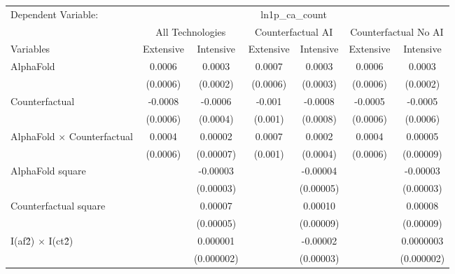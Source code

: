 \begingroup
\centering
\begin{tabular}{lcccccc}
   \tabularnewline \midrule \midrule
   Dependent Variable: & \multicolumn{6}{c}{ln1p\_ca\_count}\\
 & \multicolumn{2}{c}{All Technologies} & \multicolumn{2}{c}{Counterfactual AI} & \multicolumn{2}{c}{Counterfactual No AI} \\
\cmidrule(lr){1-1}\cmidrule(lr){2-3} \cmidrule(lr){4-5} \cmidrule(lr){6-7}
Variables & \multicolumn{1}{c}{Extensive} & \multicolumn{1}{c}{Intensive} & \multicolumn{1}{c}{Extensive} & \multicolumn{1}{c}{Intensive} & \multicolumn{1}{c}{Extensive} & \multicolumn{1}{c}{Intensive} \\
\cmidrule(lr){1-1}\cmidrule(lr){2-2} \cmidrule(lr){3-3} \cmidrule(lr){4-4} \cmidrule(lr){5-5} \cmidrule(lr){6-6} \cmidrule(lr){7-7}
   AlphaFold                          & 0.0006   & 0.0003     & 0.0007   & 0.0003    & 0.0006   & 0.0003\\   
                                      & (0.0006) & (0.0002)   & (0.0006) & (0.0003)  & (0.0006) & (0.0002)\\   
   Counterfactual                     & -0.0008  & -0.0006    & -0.001   & -0.0008   & -0.0005  & -0.0005\\   
                                      & (0.0006) & (0.0004)   & (0.001)  & (0.0008)  & (0.0006) & (0.0006)\\   
   AlphaFold $\times$ Counterfactual  & 0.0004   & 0.00002    & 0.0007   & 0.0002    & 0.0004   & 0.00005\\   
                                      & (0.0006) & (0.00007)  & (0.001)  & (0.0004)  & (0.0006) & (0.00009)\\   
   AlphaFold square                   &          & -0.00003   &          & -0.00004  &          & -0.00003\\   
                                      &          & (0.00003)  &          & (0.00005) &          & (0.00003)\\   
   Counterfactual square              &          & 0.00007    &          & 0.00010   &          & 0.00008\\   
                                      &          & (0.00005)  &          & (0.00009) &          & (0.00009)\\   
   I(af\^2) $\times$ I(ct\^2)         &          & 0.000001   &          & -0.00002  &          & 0.0000003\\   
                                      &          & (0.000002) &          & (0.00003) &          & (0.000002)\\   

\end{tabular}
